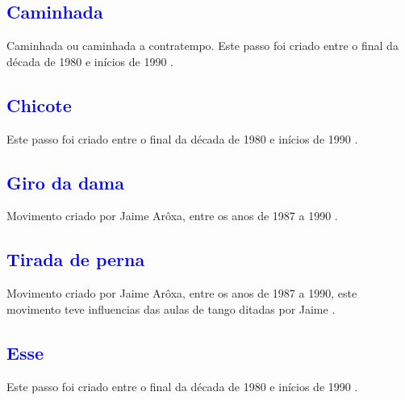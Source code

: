 
\subsection{\textcolor{blue}{Caminhada}} 
 Caminhada ou caminhada a contratempo.
Este passo foi  criado entre o final da década de 1980 e inícios de 1990  \cite[pp. 143]{perna2002samba}.

\subsection{\textcolor{blue}{Chicote}} 
Este passo foi  criado entre o final da década de 1980 e inícios de 1990  \cite[pp. 143]{perna2002samba}.

\subsection{\textcolor{blue}{Giro da dama}}
Movimento criado por Jaime Arôxa, entre os anos de 1987 a 1990 \cite{EntrevistaJaimeAroxa1} \cite[pp. 144]{perna2002samba}.


\subsection{\textcolor{blue}{Tirada de perna}}
Movimento criado por Jaime Arôxa, entre os anos de 1987 a 1990,
este movimento teve influencias das aulas de tango ditadas por Jaime \cite{EntrevistaJaimeAroxa1} \cite[pp. 144]{perna2002samba}.

\subsection{\textcolor{blue}{Esse}}
Este passo foi  criado entre o final da década de 1980 e inícios de 1990  \cite[pp. 143]{perna2002samba}.

